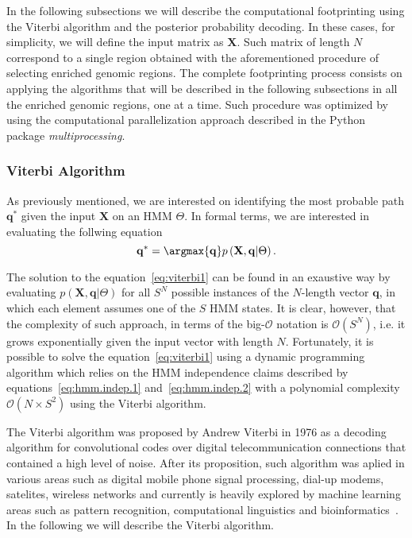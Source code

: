 In the following subsections we will describe the computational footprinting using the Viterbi algorithm and the posterior probability decoding. In these cases, for simplicity, we will define the input matrix as $ \mathbf{X} $. Such matrix of length $ N $ correspond to a single region obtained with the aforementioned procedure of selecting enriched genomic regions. The complete footprinting process consists on applying the algorithms that will be described in the following subsections in all the enriched genomic regions, one at a time. Such procedure was optimized by using the computational parallelization approach described in the Python package \emph{multiprocessing}.

\subsubsection{Viterbi Algorithm}
\label{sec:viterbi.algorithm}

As previously mentioned, we are interested on identifying the most probable path $ \mathbf{q^*} $ given the input $ \mathbf{X} $ on an HMM $ \Theta $. In formal terms, we are interested in evaluating the follwing equation
\begin{equation}
  \label{eq:viterbi1}
  \mathbf{q^*} = \argmax{\mathbf{q}} p\left(\mathbf{X}, \mathbf{q} | \Theta \right).
\end{equation}

The solution to the equation~\ref{eq:viterbi1} can be found in an exaustive way by evaluating $ p\left(\mathbf{X}, \mathbf{q} | \Theta \right) $ for all $ S^N $ possible instances of the $N$-length vector $ \mathbf{q} $, in which each element assumes one of the $S$ HMM states. It is clear, however, that the complexity of such approach, in terms of the big-$\mathcal{O}$ notation is $ \mathcal{O}(S^N) $, i.e. it grows exponentially given the input vector with length $N$. Fortunately, it is possible to solve the equation~\ref{eq:viterbi1} using a dynamic programming algorithm which relies on the HMM independence claims described by equations~\ref{eq:hmm.indep.1} and~\ref{eq:hmm.indep.2} with a polynomial complexity $ \mathcal{O}(N \times S^2) $ using the Viterbi algorithm.

The Viterbi algorithm was proposed by Andrew Viterbi in 1976 as a decoding algorithm for convolutional codes over digital telecommunication connections that contained a high level of noise. After its proposition, such algorithm was aplied in various areas such as digital mobile phone signal processing, dial-up modems, satelites, wireless networks and currently is heavily explored by machine learning areas such as pattern recognition, computational linguistics and bioinformatics~\cite{rabiner1989}. In the following we will describe the Viterbi algorithm.

